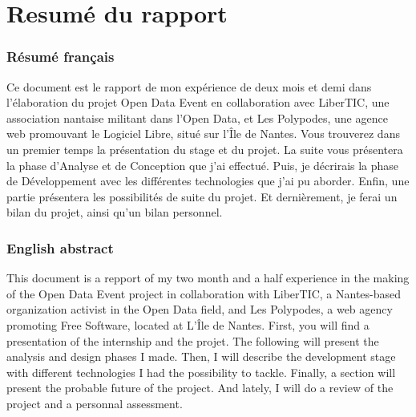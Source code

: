 \part*{Resumé du rapport}

\section*{Résumé français}

Ce document est le rapport de mon expérience de deux mois et demi dans l'élaboration du projet Open Data Event en collaboration avec LiberTIC, une association nantaise militant dans l'Open Data, et Les Polypodes, une agence web promouvant le Logiciel Libre, situé sur l'Île de Nantes. Vous trouverez dans un premier temps la présentation du stage et du projet. La suite vous présentera la phase d'Analyse et de Conception que j'ai effectué. Puis, je décrirais la phase de Développement avec les différentes technologies que j'ai pu aborder. Enfin, une partie présentera les possibilités de suite du projet. Et dernièrement, je ferai un bilan du projet, ainsi qu'un bilan personnel.

\section*{English abstract}

This document is a repport of my two month and a half experience in the making of the Open Data Event project in collaboration with LiberTIC, a Nantes-based organization activist in the Open Data field, and Les Polypodes, a web agency promoting Free Software, located at L'Île de Nantes. First, you will find a presentation of the internship and the projet. The following will present the analysis and design phases I made. Then, I will describe the development stage with different technologies I had the possibility to tackle. Finally, a section will present the probable future of the project. And lately, I will do a review of the project and a personnal assessment.